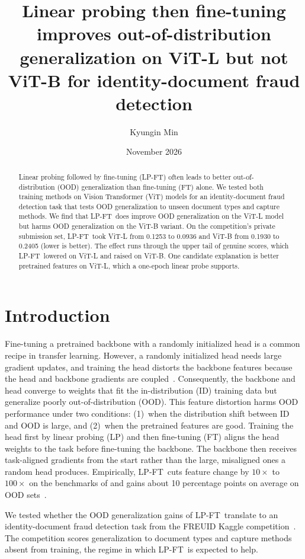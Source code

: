 \documentclass[10pt]{article}
\title{Linear probing then fine-tuning improves out-of-distribution generalization on ViT-L but not ViT-B for identity-document fraud detection}
\author{Kyungin Min}
\affil{\texttt{kyunginstevenmin@gmail.com}}
\date{November 2026}
\newcommand{\lpft}{LP-FT}
\begin{document}
\maketitle

\begin{abstract}
\noindent Linear probing followed by fine-tuning (\lpft) often leads to better out-of-distribution (OOD) generalization than fine-tuning (FT) alone. We tested both training methods on Vision Transformer (ViT) models for an identity-document fraud detection task that tests OOD generalization to unseen document types and capture methods. We find that \lpft\ does improve OOD generalization on the ViT-L model but harms OOD generalization on the ViT-B variant. On the competition's private submission set, \lpft\ took ViT-L from 0.1253 to 0.0936 and ViT-B from 0.1930 to 0.2405 (lower is better). The effect runs through the upper tail of genuine scores, which \lpft\ lowered on ViT-L and raised on ViT-B. One candidate explanation is better pretrained features on ViT-L, which a one-epoch linear probe supports.
\end{abstract}

\section{Introduction}
Fine-tuning a pretrained backbone with a randomly initialized head is a common recipe in transfer learning. However, a randomly initialized head needs large gradient updates, and training the head distorts the backbone features because the head and backbone gradients are coupled~\citep{kumar2022finetuning}. Consequently, the backbone and head converge to weights that fit the in-distribution (ID) training data but generalize poorly out-of-distribution (OOD). This feature distortion harms OOD performance under two conditions: (1)~when the distribution shift between ID and OOD is large, and (2)~when the pretrained features are good. Training the head first by linear probing (LP) and then fine-tuning (FT) aligns the head weights to the task before fine-tuning the backbone. The backbone then receives task-aligned gradients from the start rather than the large, misaligned ones a random head produces. Empirically, \lpft\ cuts feature change by $10\times$ to $100\times$ on the benchmarks of \citet{kumar2022finetuning} and gains about 10 percentage points on average on OOD sets~\citep{kumar2022finetuning}.

We tested whether the OOD generalization gains of \lpft\ translate to an identity-document fraud detection task from the FREUID Kaggle competition~\citep{freuid2026}. The competition scores generalization to document types and capture methods absent from training, the regime in which \lpft\ is expected to help.
\end{document}
